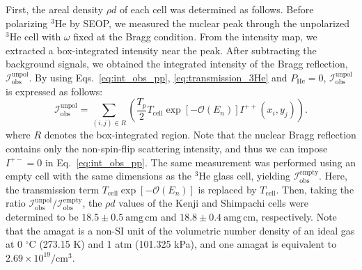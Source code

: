 \documentclass[%
 reprint,
superscriptaddress,
 amsmath,amssymb,
 aps,
floatfix,
]{revtex4-2}
\newcommand{\He}{$^3$He }
\begin{document}
First, the areal density $\rho d$ of each cell was determined as follows.
Before polarizing \He by SEOP, we measured the nuclear peak through the unpolarized \He cell with $\omega$ fixed at the Bragg condition.
From the intensity map, we extracted a box-integrated intensity near the peak.
After subtracting the background signals, we obtained the integrated intensity of the Bragg reflection, $\mathcal{I}_\mathrm{obs}^\mathrm{unpol}$.
By using Eqs.~\ref{eq:int_obs_pp}, \ref{eq:transmission_3He} and $P_\mathrm{He}=0$, $\mathcal{I}_\mathrm{obs}^\mathrm{unpol}$ is expressed as follows:
\begin{equation}
    \mathcal{I}^\mathrm{unpol}_\mathrm{obs}
    =\sum_{(i,j)\in R}
    \left(
    \frac{T_p}{2}
    T_\mathrm{cell}
    \exp[-\mathcal{O}(E_n)]
    I^{++}(x_i,y_j)
    \right).
    \label{eq:unpol}
\end{equation}
where $R$ denotes the box-integrated region.
Note that the nuclear Bragg reflection contains only the non-spin-flip scattering intensity, and thus we can impose $I^{+-} = 0$ in Eq.~\ref{eq:int_obs_pp}.
The same measurement was performed using an empty cell with the same dimensions as the \He glass cell, yielding $\mathcal{I}^\mathrm{empty}_\mathrm{obs}$.
Here, the transmission term $T_\mathrm{cell}\exp[-\mathcal{O}(E_n)]$ is replaced by $T_\mathrm{cell}$.
Then, taking the ratio $\mathcal{I}^\mathrm{unpol}_\mathrm{obs}/\mathcal{I}^\mathrm{empty}_\mathrm{obs}$, the $\rho d$ values of the Kenji and Shimpachi cells were determined to be $18.5 \pm 0.5~\mathrm{amg\,cm}$ and $18.8 \pm 0.4~\mathrm{amg\,cm}$, respectively.
Note that the amagat is a non-SI unit of the volumetric number density of an ideal gas at 0 $^{\circ}$C (273.15 K) and 1 atm (101.325 kPa), and one amagat is equivalent to $2.69\times 10^{19} /\textrm{cm}^3$.
\end{document}
